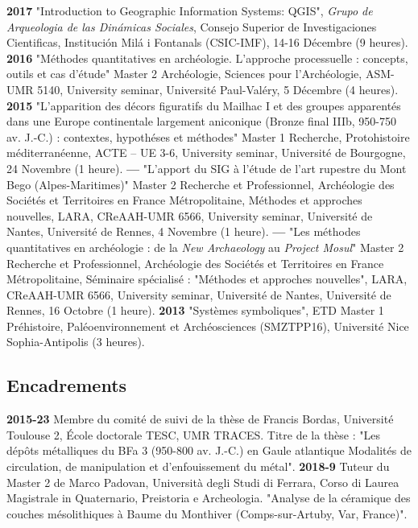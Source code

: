 \documentclass{article}
\begin{document}
\smallbreak 
\textbf{2017 }"Introduction to Geographic Information Systems: QGIS", \textit{Grupo de Arqueologia de las Din\'{a}micas Sociales}, Consejo Superior de Investigaciones Cientificas, Instituci\'{o}n Mil\'{a} i Fontanals (CSIC-IMF), 14-16 Décembre (9 heures).
\smallbreak
\textbf{2016 }"M\'{e}thodes quantitatives en arch\'{e}ologie. L'approche processuelle : concepts, outils et cas d'\'{e}tude" Master 2 Arch\'{e}ologie, Sciences pour l'Arch\'{e}ologie, ASM-UMR 5140, University seminar, Universit\'{e} Paul-Val\'{e}ry, 5 Décembre (4 heures).
\smallbreak
\textbf{2015 }"L'apparition des d\'{e}cors figuratifs du Mailhac I et des groupes apparent\'{e}s dans une Europe continentale largement aniconique (Bronze final IIIb, 950-750 av. J.-C.) : contextes, hypoth\'{e}ses et m\'{e}thodes" Master 1 Recherche, Protohistoire m\'{e}diterran\'{e}enne, ACTE -- UE 3-6, University seminar, Universit\'{e} de Bourgogne, 24 Novembre (1 heure).
\smallbreak
\textbf{--- }"L'apport du SIG \`{a} l'\'{e}tude de l'art rupestre du Mont Bego (Alpes-Maritimes)" Master 2 Recherche et Professionnel, Arch\'{e}ologie des Soci\'{e}t\'{e}s et Territoires en France M\'{e}tropolitaine, M\'{e}thodes et approches nouvelles, LARA, CReAAH-UMR 6566, University seminar, Universit\'{e} de Nantes, Universit\'{e} de Rennes, 4 Novembre (1 heure).
\smallbreak
\textbf{--- }"Les m\'{e}thodes quantitatives en arch\'{e}ologie : de la \textit{New Archaeology} au \textit{Project Mosul}" Master 2 Recherche et Professionnel, Arch\'{e}ologie des Soci\'{e}t\'{e}s et Territoires en France M\'{e}tropolitaine, S\'{e}minaire sp\'{e}cialis\'{e} : "M\'{e}thodes et approches nouvelles", LARA, CReAAH-UMR 6566, University seminar, Universit\'{e} de Nantes, Universit\'{e} de Rennes, 16 Octobre (1 heure).
\smallbreak
\textbf{2013 } "Systèmes symboliques", ETD Master 1 Préhistoire, Paléoenvironnement et Archéosciences (SMZTPP16), Université Nice Sophia-Antipolis (3 heures).

\subsection*{Encadrements}

\textbf{2015-23} Membre du comité de suivi de la thèse de Francis Bordas, Université Toulouse 2, École doctorale TESC, UMR TRACES. Titre de la thèse : "Les dépôts métalliques du BFa 3 (950-800 av. J.-C.) en Gaule atlantique Modalités de circulation, de manipulation et d’enfouissement du métal".
\smallbreak
\textbf{2018-9} Tuteur du Master 2 de Marco Padovan, Università degli Studi di Ferrara, Corso di Laurea Magistrale in Quaternario, Preistoria e Archeologia. "Analyse de la céramique des couches mésolithiques à Baume du Monthiver (Comps-sur-Artuby, Var, France)".
\end{document}

